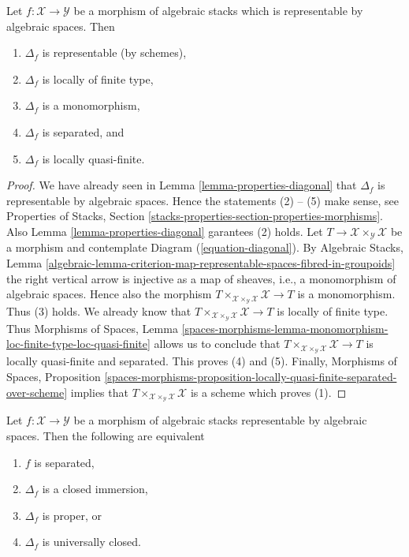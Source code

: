 \begin{lemma}
\label{lemma-properties-diagonal-representable}
Let $f : \mathcal{X} \to \mathcal{Y}$ be a morphism of algebraic stacks
which is representable by algebraic spaces. Then
\begin{enumerate}
\item $\Delta_f$ is representable
(by schemes),
\item $\Delta_f$ is locally of finite type,
\item $\Delta_f$ is a monomorphism,
\item $\Delta_f$ is separated, and
\item $\Delta_f$ is locally quasi-finite.
\end{enumerate}
\end{lemma}

\begin{proof}
We have already seen in
Lemma \ref{lemma-properties-diagonal}
that $\Delta_f$ is representable by algebraic
spaces. Hence the statements (2) -- (5) make sense, see
Properties of Stacks,
Section \ref{stacks-properties-section-properties-morphisms}.
Also
Lemma \ref{lemma-properties-diagonal}
garantees (2) holds.
Let $T \to \mathcal{X} \times_\mathcal{Y} \mathcal{X}$ be a morphism
and contemplate Diagram (\ref{equation-diagonal}). By
Algebraic Stacks, Lemma
\ref{algebraic-lemma-criterion-map-representable-spaces-fibred-in-groupoids}
the right vertical arrow is injective as a map of sheaves, i.e., a
monomorphism of algebraic spaces. Hence also the morphism
$T \times_{\mathcal{X} \times_\mathcal{Y} \mathcal{X}} \mathcal{X} \to T$
is a monomorphism. Thus (3) holds. We already know that
$T \times_{\mathcal{X} \times_\mathcal{Y} \mathcal{X}} \mathcal{X} \to T$
is locally of finite type. Thus
Morphisms of Spaces, Lemma
\ref{spaces-morphisms-lemma-monomorphism-loc-finite-type-loc-quasi-finite}
allows us to conclude that
$T \times_{\mathcal{X} \times_\mathcal{Y} \mathcal{X}} \mathcal{X} \to T$
is locally quasi-finite and separated. This proves (4) and (5).
Finally,
Morphisms of Spaces, Proposition
\ref{spaces-morphisms-proposition-locally-quasi-finite-separated-over-scheme}
implies that
$T \times_{\mathcal{X} \times_\mathcal{Y} \mathcal{X}} \mathcal{X}$
is a scheme which proves (1).
\end{proof}

\begin{lemma}
\label{lemma-representable-separated-diagonal-closed}
Let $f : \mathcal{X} \to \mathcal{Y}$ be a morphism of algebraic stacks
representable by algebraic spaces. Then the following are equivalent
\begin{enumerate}
\item $f$ is separated,
\item $\Delta_f$ is a closed immersion,
\item $\Delta_f$ is proper, or
\item $\Delta_f$ is universally closed.
\end{enumerate}
\end{lemma}


